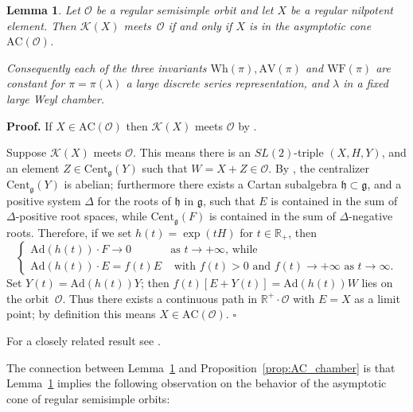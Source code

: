 \documentclass[10pt,leqno]{article}
\newtheorem{lemma}[equation]{Lemma}
\newcommand{\qed}{\hfill $\square$ \medskip}
\newenvironment{proof}[1][Proof]{\noindent\textbf{#1.} }{\qed}
\newcommand{\Ad}{\mathrm{Ad}}
\newcommand{\Cent}{\mathrm{Cent}}
\renewcommand{\O}{\mathcal O}
\newcommand{\R}{\mathbb R}
\newcommand{\g}{\mathfrak g}
\newcommand{\AV}{\mathrm{AV}}
\newcommand{\Wh}{\mathrm{Wh}}
\newcommand{\WF}{\mathrm{WF}}
\newcommand{\AC}{\mathrm{AC}}
\newcommand{\Kostant}[1]{\mathcal{K}(#1)}
\begin{document}
\begin{lemma}\label{lem:Kost_and_AC} Let $\mathcal{O}$ be a regular semisimple orbit and  let $X$ be a regular nilpotent element. Then $\Kostant{X}$ meets~$\mathcal{O}$ if and only if $X$ is in the asymptotic cone~$\AC(\mathcal{O})$. 

Consequently each of the three invariants $\Wh(\pi),\AV(\pi)$ and $\WF(\pi)$ are constant for $\pi=\pi(\lambda)$ a large discrete series representation, and $\lambda$ in a fixed large Weyl chamber.
\end{lemma}
\begin{proof} 
If $X\in \AC(\mathcal O)$ then $\Kostant{X}$ meets $\mathcal O$ by \cite[Lemma 3.2.3]{adams_kaletha}.

Suppose $\Kostant{X}$ meets $\mathcal O$.
This means there is an $SL(2)$-triple $(X,H,Y)$, and an element $Z\in \Cent_\g(Y)$ such that $W=X+Z \in \O$. 
By \cite{Kostant59}, the centralizer  $\mathrm{Cent}_{\g}(Y)$ is abelian; furthermore there exists a Cartan subalgebra $\mathfrak{h} \subset \g$, and a positive system $\Delta$ for the roots of $\mathfrak{h}$ in $\g$, such that $E$ is contained in the sum of $\Delta$-positive root spaces, while $\mathrm{Cent}_{\g}(F)$ is contained in the sum of $\Delta$-negative roots.  Therefore, if we set $h(t) = \exp(tH)$ for $t \in \R_+$, then 
\[\begin{cases} \mathrm{Ad}(h(t)) \cdot F \longrightarrow 0 & \text{as $t \to +\infty$, while} \\
 \mathrm{Ad}(h(t)) \cdot E = f(t) E & \text{ with $f(t) >0$ and $f(t)\to +\infty$ as $t \to \infty$.}\end{cases}\]
Set $Y(t) = \mathrm{Ad}(h(t)) Y$; then $f(t) \left[ E + Y(t) \right] = \mathrm{Ad}(h(t)) W$ lies on the orbit~$\mathcal{O}$. Thus there exists a continuous path in $\R^+ \cdot \mathcal{O}$ with $E=X$ as a limit point; by definition this means $X \in \AC(\mathcal{O})$.%
\end{proof}

For a closely related result see \cite[Proposition 3.5]{fm}.

The connection between Lemma~\ref{lem:Kost_and_AC} and Proposition~\ref{prop:AC_chamber} is that Lemma~\ref{lem:Kost_and_AC}  implies the  following observation on the behavior of the asymptotic cone of regular semisimple orbits: 
\end{document}
